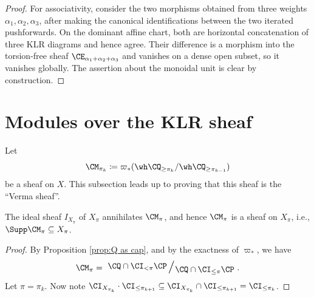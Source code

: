 \documentclass[11pt,reqno]{amsart}
\begin{document}
\begin{proof}
For associativity, consider the two morphisms obtained from three
weights $\alpha_1,\alpha_2,\alpha_3$, after making the canonical
identifications between the two iterated pushforwards. On the
dominant affine chart, both are horizontal concatenation of three KLR
diagrams and hence agree. Their difference is a morphism into the
torsion-free sheaf $\CE_{\alpha_1+\alpha_2+\alpha_3}$ and vanishes on
a dense open subset, so it vanishes globally. The assertion about the
monoidal unit is clear by construction.
\end{proof}





\section{Modules over the KLR sheaf}
Let\[\CM_{\pi_k}\coloneqq\varpi_* (\wh\CQ_{\ge\pi_k}/\wh\CQ_{\ge\pi_{k-1}})\]
be a sheaf on $X$. This subsection leads up to proving that this sheaf is the ``Verma sheaf''. 

\begin{lemma}\label{lem:supp M in X}
    The ideal sheaf $I_{X_\pi}$ of $X_\pi$ annihilates $\CM_\pi$, and hence $\CM_\pi$ is a sheaf on $X_\pi$, i.e., $\Supp \CM_\pi\subseteq X_\pi$. 
\end{lemma}
\begin{proof}
    By Proposition \ref{prop:Q as cap}, and by the exactness of $\varpi_*$, we have
    \[\CM_\pi=\mfrac{\CQ\cap\CI_{<\pi}\CP}{\CQ\cap \CI_{\le\pi}\CP}.\] 
    Let $\pi=\pi_k$. Now note $\CI_{X_{\pi_k}}\cdot \CI_{\le\pi_{k+1}}\subseteq \CI_{X_{\pi_k}}\cap\CI_{\le\pi_{k+1}}=\CI_{\le\pi_k}$.
\end{proof}
\end{document}
